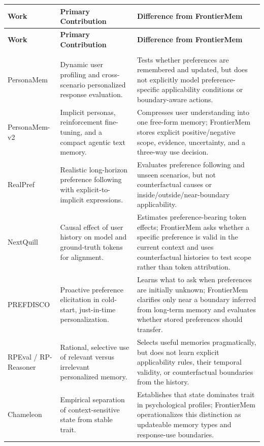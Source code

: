 \documentclass[10.5pt,a4paper]{article}
\begin{document}
\small
\begin{longtable}{P{2.15cm}P{3.05cm}P{10.65cm}}
\toprule
{}
\textbf{Work} & \textbf{Primary Contribution} & \textbf{Difference from FrontierMem}\\
\midrule
\endfirsthead
\toprule
{}
\textbf{Work} & \textbf{Primary Contribution} & \textbf{Difference from FrontierMem}\\
\midrule
\endhead
\midrule
{}\\
\endfoot
\bottomrule
\endlastfoot
PersonaMem \cite{personamem} & Dynamic user profiling and cross-scenario personalized response evaluation. & Tests whether preferences are remembered and updated, but does not explicitly model preference-specific applicability conditions or boundary-aware actions.\\
PersonaMem-v2 \cite{personamemv2} & Implicit personas, reinforcement fine-tuning, and a compact agentic text memory. & Compresses user understanding into one free-form memory; FrontierMem stores explicit positive/negative scope, evidence, uncertainty, and a three-way use decision.\\
RealPref \cite{realpref} & Realistic long-horizon preference following with explicit-to-implicit expressions. & Evaluates preference following and unseen scenarios, but not counterfactual causes or inside/outside/near-boundary applicability.\\
NextQuill \cite{nextquill} & Causal effect of user history on model and ground-truth tokens for alignment. & Estimates preference-bearing token effects; FrontierMem asks whether a specific preference is valid in the current context and uses counterfactual histories to test scope rather than token attribution.\\
PREFDISCO \cite{prefdisco} & Proactive preference elicitation in cold-start, just-in-time personalization. & Learns what to ask when preferences are initially unknown; FrontierMem clarifies only near a boundary inferred from long-term memory and evaluates whether stored preferences should transfer.\\
RPEval / RP-Reasoner \cite{rpeval} & Rational, selective use of relevant versus irrelevant personalized memory. & Selects useful memories pragmatically, but does not learn explicit applicability rules, their temporal validity, or counterfactual boundaries from the history.\\
Chameleon \cite{chameleon} & Empirical separation of context-sensitive state from stable trait. & Establishes that state dominates trait in psychological profiles; FrontierMem operationalizes this distinction as updateable memory types and response-use boundaries.\\

\end{longtable}
\end{document}
